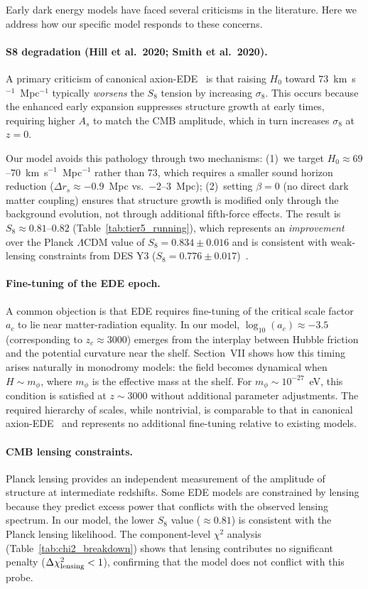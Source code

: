 \documentclass[a4paper,11pt]{article}
\begin{document}
Early dark energy models have faced several criticisms in the literature. Here we address how our specific model responds to these concerns.

\paragraph{S8 degradation (Hill et al.\ 2020; Smith et al.\ 2020).}
A primary criticism of canonical axion-EDE~\cite{Hill2020,Smith2020} is that raising $H_0$ toward $73$~km~s$^{-1}$~Mpc$^{-1}$ typically \emph{worsens} the $S_8$ tension by increasing $\sigma_8$. This occurs because the enhanced early expansion suppresses structure growth at early times, requiring higher $A_s$ to match the CMB amplitude, which in turn increases $\sigma_8$ at $z=0$.

Our model avoids this pathology through two mechanisms: (1)~we target $H_0 \approx 69$--$70$~km~s$^{-1}$~Mpc$^{-1}$ rather than $73$, which requires a smaller sound horizon reduction ($\Delta r_s \approx -0.9$~Mpc vs.\ $-2$--$3$~Mpc); (2)~setting $\beta = 0$ (no direct dark matter coupling) ensures that structure growth is modified only through the background evolution, not through additional fifth-force effects. The result is $S_8 \approx 0.81$--$0.82$ (Table~\ref{tab:tier5_running}), which represents an \emph{improvement} over the Planck $\Lambda$CDM value of $S_8 = 0.834 \pm 0.016$ and is consistent with weak-lensing constraints from DES Y3 ($S_8 = 0.776 \pm 0.017$)~\cite{DES_Y3}.

\paragraph{Fine-tuning of the EDE epoch.}
A common objection is that EDE requires fine-tuning of the critical scale factor $a_c$ to lie near matter-radiation equality. In our model, $\log_{10}(a_c) \approx -3.5$ (corresponding to $z_c \approx 3000$) emerges from the interplay between Hubble friction and the potential curvature near the shelf. Section~VII shows how this timing arises naturally in monodromy models: the field becomes dynamical when $H \sim m_\phi$, where $m_\phi$ is the effective mass at the shelf. For $m_\phi \sim 10^{-27}$~eV, this condition is satisfied at $z \sim 3000$ without additional parameter adjustments. The required hierarchy of scales, while nontrivial, is comparable to that in canonical axion-EDE~\cite{Poulin2019} and represents no additional fine-tuning relative to existing models.

\paragraph{CMB lensing constraints.}
Planck lensing provides an independent measurement of the amplitude of structure at intermediate redshifts. Some EDE models are constrained by lensing because they predict excess power that conflicts with the observed lensing spectrum. In our model, the lower $S_8$ value ($\approx 0.81$) is consistent with the Planck lensing likelihood. The component-level $\chi^2$ analysis (Table~\ref{tab:chi2_breakdown}) shows that lensing contributes no significant penalty ($\Delta\chi^2_{\rm lensing} < 1$), confirming that the model does not conflict with this probe.
\end{document}
